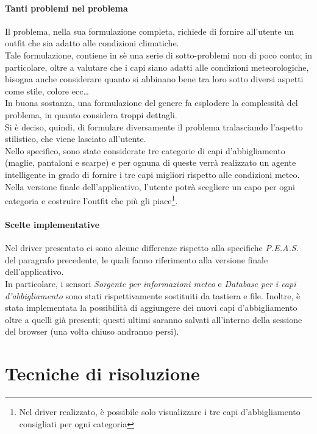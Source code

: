 \documentclass[a4paper, 11pt, oneside]{report}
\begin{document}
    \subsection{Tanti problemi nel problema}
    Il problema, nella sua formulazione completa, richiede di fornire all'utente un outfit che sia adatto
    alle condizioni climatiche.\\
    Tale formulazione, contiene in sè una serie di sotto-problemi non di poco conto;
    in particolare, oltre a valutare che i capi siano adatti alle condizioni meteorologiche, bisogna anche considerare quanto si abbinano bene
    tra loro sotto diversi aspetti come stile, colore ecc\ldots\\
    In buona sostanza, una formulazione del genere fa esplodere la complessità del problema, in quanto considera troppi dettagli.\\
    Si è deciso, quindi, di formulare diversamente il problema tralasciando l'aspetto stilistico, che viene lasciato all'utente.\\
    Nello specifico, sono state considerate tre categorie di capi d'abbigliamento (maglie, pantaloni e scarpe) e per ognuna di queste verrà realizzato
    un agente intelligente in grado di fornire i tre capi migliori rispetto alle condizioni meteo.
    Nella versione finale dell'applicativo, l'utente potrà scegliere un capo per ogni categoria e costruire l'outfit che più gli piace\footnote{Nel driver realizzato, è possibile solo visualizzare i tre capi d'abbigliamento consigliati per ogni categoria}.
    \subsection{Scelte implementative}
    Nel driver presentato ci sono alcune differenze rispetto alla specifiche \emph{P.E.A.S.} del paragrafo precedente, le quali fanno
    riferimento alla versione finale dell'applicativo.\\
    In particolare, i sensori \emph{Sorgente per informazioni meteo} e \emph{Database per i capi d'abbigliamento} sono stati rispettivamente sostituiti
    da tastiera e file.
    Inoltre, è stata implementata la possibilità di aggiungere dei nuovi capi d'abbigliamento oltre a quelli già presenti;
    questi ultimi saranno salvati all'interno della sessione del browser (una volta chiuso andranno persi).
    \part{Tecniche di risoluzione}
\end{document}
